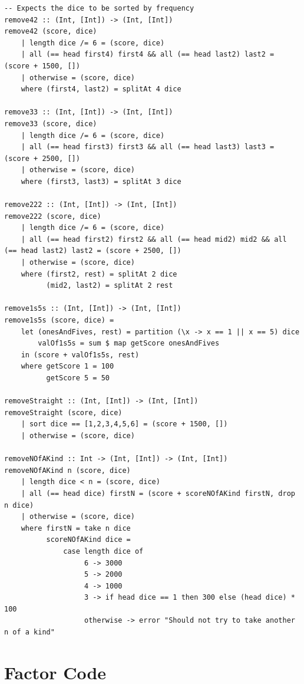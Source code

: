 \documentclass{article}
\begin{document}
\begin{verbatim}
-- Expects the dice to be sorted by frequency
remove42 :: (Int, [Int]) -> (Int, [Int])
remove42 (score, dice)
    | length dice /= 6 = (score, dice)
    | all (== head first4) first4 && all (== head last2) last2 = (score + 1500, [])
    | otherwise = (score, dice)
    where (first4, last2) = splitAt 4 dice

remove33 :: (Int, [Int]) -> (Int, [Int])
remove33 (score, dice)
    | length dice /= 6 = (score, dice)
    | all (== head first3) first3 && all (== head last3) last3 = (score + 2500, [])
    | otherwise = (score, dice)
    where (first3, last3) = splitAt 3 dice

remove222 :: (Int, [Int]) -> (Int, [Int])
remove222 (score, dice)
    | length dice /= 6 = (score, dice)
    | all (== head first2) first2 && all (== head mid2) mid2 && all (== head last2) last2 = (score + 2500, [])
    | otherwise = (score, dice)
    where (first2, rest) = splitAt 2 dice
          (mid2, last2) = splitAt 2 rest

remove1s5s :: (Int, [Int]) -> (Int, [Int])
remove1s5s (score, dice) =
    let (onesAndFives, rest) = partition (\x -> x == 1 || x == 5) dice
        valOf1s5s = sum $ map getScore onesAndFives
    in (score + valOf1s5s, rest)
    where getScore 1 = 100
          getScore 5 = 50

removeStraight :: (Int, [Int]) -> (Int, [Int])
removeStraight (score, dice)
    | sort dice == [1,2,3,4,5,6] = (score + 1500, [])
    | otherwise = (score, dice)

removeNOfAKind :: Int -> (Int, [Int]) -> (Int, [Int])
removeNOfAKind n (score, dice)
    | length dice < n = (score, dice)
    | all (== head dice) firstN = (score + scoreNOfAKind firstN, drop n dice)
    | otherwise = (score, dice)
    where firstN = take n dice
          scoreNOfAKind dice =
              case length dice of 
                   6 -> 3000
                   5 -> 2000
                   4 -> 1000
                   3 -> if head dice == 1 then 300 else (head dice) * 100
                   otherwise -> error "Should not try to take another n of a kind"
\end{verbatim}

\section{Factor Code}
\end{document}
